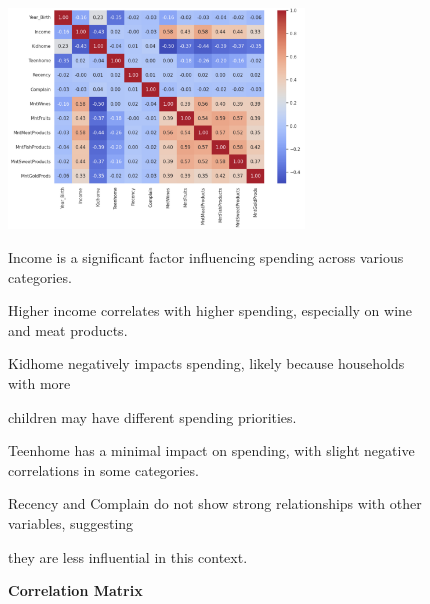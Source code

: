 \documentclass[a4paper]{article}
\begin{document}
\begin{figure}[h]
    \centering
    \includegraphics[width=0.7\textwidth]{Correlation Matrix.png}
    \caption{\textbf{Correlation Matrix}}
    
    Income is a significant factor influencing spending across various categories.
    
    Higher income correlates with higher spending, especially on wine and meat products.
    
    Kidhome negatively impacts spending, likely because households with more
    
    children may have different spending priorities.
    
    Teenhome has a minimal impact on spending, with slight negative 
    correlations in some categories.
    
    Recency and Complain do not show strong relationships with other variables, suggesting 
    
    they are less influential in this context.
    
    \label{fig:sales}
\end{figure}
\end{document}

